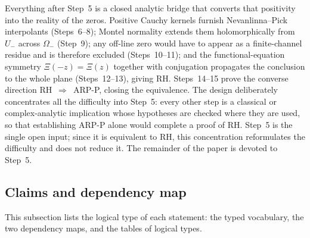 \documentclass[11pt]{amsart}
\theoremstyle{definition}
\theoremstyle{remark}
\theoremstyle{definition}
\begin{document}
Everything after Step~5 is a closed analytic bridge that converts that positivity into the reality of
the zeros.  Positive Cauchy kernels furnish Nevanlinna--Pick interpolants (Steps~6--8); Montel
normality extends them holomorphically from $U_-$ across $\Omega_-$ (Step~9); any off-line zero would
have to appear as a finite-channel residue and is therefore excluded (Steps~10--11); and the
functional-equation symmetry $\Xi(-z)=\Xi(z)$ together with conjugation propagates the conclusion to
the whole plane (Steps~12--13), giving RH.  Steps~14--15 prove the converse direction
RH~$\Rightarrow$~ARP-P, closing the equivalence.  The design deliberately concentrates all the
difficulty into Step~5: every other step is a classical or complex-analytic implication whose
hypotheses are checked where they are used, so that establishing ARP-P alone would complete a proof of
RH.  Step~5 is the single open input; since it is equivalent to RH, this concentration reformulates the
difficulty and does not reduce it.  The remainder of the paper is devoted to Step~5.

\subsection{Claims and dependency map}\label{sec:status-map}

This subsection lists the logical type of each statement: the typed vocabulary, the two
dependency maps, and the tables of logical types.
\end{document}
